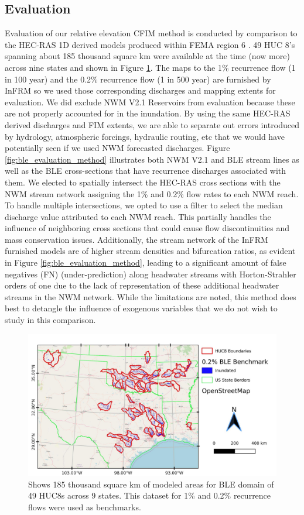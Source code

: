 \subsection{Evaluation}
\label{ssec:evaluation}
%
Evaluation of our relative elevation CFIM method is conducted by comparison to the HEC-RAS 1D derived models produced within FEMA region 6 \cite{fema2021base,fema2021estimated}.
49 HUC 8's spanning about 185 thousand square km were available at the time (now more) across nine states and shown in Figure \ref{fig:all_ble_maps}.
The maps to the 1\% recurrence flow (1 in 100 year) and the 0.2\% recurrence flow (1 in 500 year) are furnished by InFRM so we used those corresponding discharges and mapping extents for evaluation.
We did exclude NWM V2.1 Reservoirs from evaluation because these are not properly accounted for in the inundation.
By using the same HEC-RAS derived discharges and FIM extents, we are able to separate out errors introduced by hydrology, atmospheric forcings, hydraulic routing, etc that we would have potentially seen if we used NWM forecasted discharges.
Figure \ref{fig:ble_evaluation_method} illustrates both NWM V2.1 and BLE stream lines as well as the BLE cross-sections that have recurrence discharges associated with them.
We elected to spatially intersect the HEC-RAS cross sections with the NWM stream network assigning the 1\% and 0.2\% flow rates to each NWM reach. 
To handle multiple intersections, we opted to use a filter to select the median discharge value attributed to each NWM reach.
This partially handles the influence of neighboring cross sections that could cause flow discontinuities and mass conservation issues.
Additionally, the stream network of the InFRM furnished models are of higher stream densities and bifurcation ratios, as evident in Figure \ref{fig:ble_evaluation_method}, leading to a significant amount of false negatives (FN) (under-prediction) along headwater streams with Horton-Strahler orders of one due to the lack of representation of these additional headwater streams in the NWM network.
While the limitations are noted, this method does best to detangle the influence of exogenous variables that we do not wish to study in this comparison.
%
\begin{figure}[h!]
\centering
\includegraphics[scale=1.0]{figures/all_ble_maps.jpg}
\caption{Shows 185 thousand square km of modeled areas for BLE domain of 49 HUC8s across 9 states. This dataset for 1\% and 0.2\% recurrence flows were used as benchmarks.}
\label{fig:all_ble_maps}
\end{figure}
